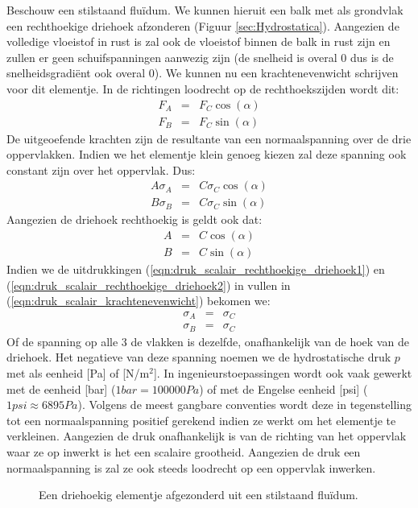 Beschouw een stilstaand fluïdum. We kunnen hieruit een balk met als grondvlak een rechthoekige driehoek afzonderen (Figuur \ref{sec:Hydrostatica}). Aangezien de volledige vloeistof in rust is zal ook de vloeistof binnen de balk in rust zijn en zullen er geen schuifspanningen aanwezig zijn (de snelheid is overal 0 dus is de snelheidsgradiënt ook overal 0). We kunnen nu een krachtenevenwicht schrijven voor dit elementje. In de richtingen loodrecht op de rechthoekszijden wordt dit:
\begin{eqnarray}
	F_A &=& F_C \cos(\alpha) \\
	F_B &=& F_C \sin(\alpha)
\end{eqnarray}
De uitgeoefende krachten zijn de resultante van een normaalspanning over de drie oppervlakken. Indien we het elementje klein genoeg kiezen zal deze spanning ook constant zijn over het oppervlak. Dus:
\begin{eqnarray}
	A \sigma_A &=& C \sigma_C \cos(\alpha) \\
	B \sigma_B &=& C \sigma_C \sin(\alpha)
	\label{eqn:druk_scalair_krachtenevenwicht}
\end{eqnarray}
Aangezien de driehoek rechthoekig is geldt ook dat:
\begin{eqnarray}
	A &=& C \cos(\alpha) 
	\label{eqn:druk_scalair_rechthoekige_driehoek1} \\
	B &=& C \sin(\alpha)
	\label{eqn:druk_scalair_rechthoekige_driehoek2}
\end{eqnarray}
Indien we de uitdrukkingen (\ref{eqn:druk_scalair_rechthoekige_driehoek1}) en (\ref{eqn:druk_scalair_rechthoekige_driehoek2}) in vullen in (\ref{eqn:druk_scalair_krachtenevenwicht}) bekomen we:
\begin{eqnarray}
	\sigma_A &=& \sigma_C \\
	\sigma_B &=& \sigma_C
	\label{eqn:druk_scalair}
\end{eqnarray}
Of de spanning op alle 3 de vlakken is dezelfde, onafhankelijk van de hoek van de driehoek. Het negatieve van deze spanning noemen we de hydrostatische druk $p$ met als eenheid [Pa] of [N/m$^2$]. In ingenieurstoepassingen wordt ook vaak gewerkt met de eenheid [bar] ($\unit{1}{bar} = \unit{100000}{Pa}$) of met de Engelse eenheid [psi] ($\unit{1}{psi} \approx \unit{6895}{Pa}$). Volgens de meest gangbare conventies wordt deze in tegenstelling tot een normaalspanning positief gerekend indien ze werkt om het elementje te verkleinen. Aangezien de druk onafhankelijk is van de richting van het oppervlak waar ze op inwerkt is het een scalaire grootheid. Aangezien de druk een normaalspanning is zal ze ook steeds loodrecht op een oppervlak inwerken.
\begin{figure}[htb]
	\centering
	
	\caption{Een driehoekig elementje afgezonderd uit een stilstaand fluïdum.}
	\label{fig:driehoek_uit_stilstaande_vloeistof}
\end{figure}

